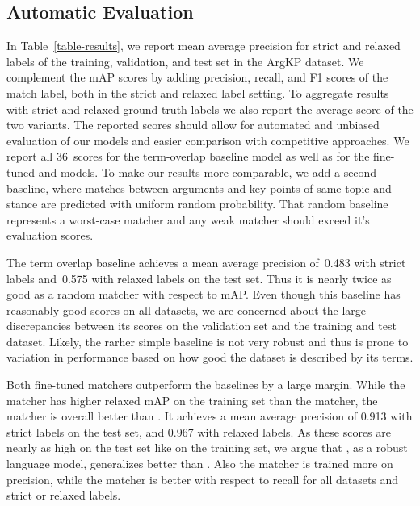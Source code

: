 \subsection{Automatic Evaluation}

In Table~\ref{table-results}, we report mean average precision for strict and relaxed labels of the training, validation, and test set in the ArgKP dataset.
We complement the mAP scores by adding precision, recall, and F1 scores of the match label, both in the strict and relaxed label setting.
To aggregate results with strict and relaxed ground-truth labels we also report the average score of the two variants.
The reported scores should allow for automated and unbiased evaluation of our models and easier comparison with competitive approaches.
We report all 36~scores for the term-overlap baseline model as well as for the fine-tuned \BertBase and \RobertaBase models.
To make our results more comparable, we add a second baseline, where matches between arguments and key points of same topic and stance are predicted with uniform random probability.
That random baseline represents a worst-case matcher and any weak matcher should exceed it's evaluation scores.

The term overlap baseline achieves a mean average precision of~0.483 with strict labels and~0.575 with relaxed labels on the test set.
Thus it is nearly twice as good as a random matcher with respect to mAP.
Even though this baseline has reasonably good scores on all datasets, we are concerned about the large discrepancies between its scores on the validation set and the training and test dataset.
Likely, the rarher simple baseline is not very robust and thus is prone to variation in performance based on how good the dataset is described by its terms.

Both fine-tuned matchers outperform the baselines by a large margin.
While the \BertBase matcher has higher relaxed mAP on the training set than the \RobertaBase matcher, the \RobertaBase matcher is overall better than \Bert.
It achieves a mean average precision of 0.913 with strict labels on the test set, and 0.967 with relaxed labels. As these scores are nearly as high on the test set like on the training set, we argue that \Roberta, as a robust language model, generalizes better than \Bert.
Also the \RobertaBase matcher is trained more on precision, while the \BertBase matcher is better with respect to recall for all datasets and strict or relaxed labels.


